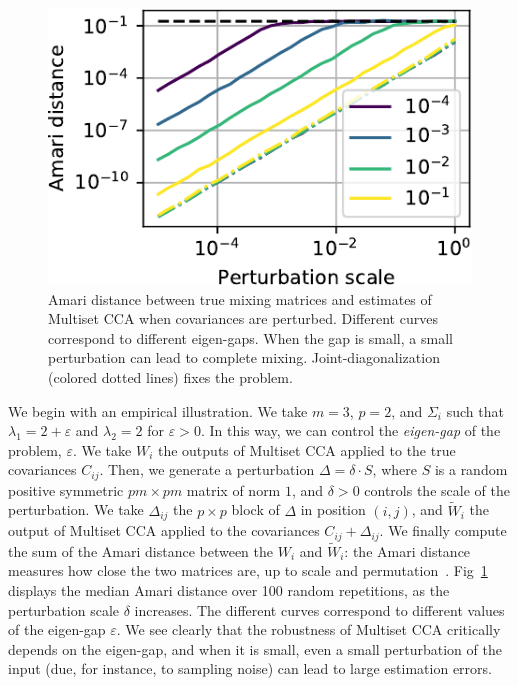 \begin{figure}
\centering
\includegraphics[width=.99\linewidth]{figures/amvica/multicca_gap_jd.pdf}
\caption{Amari distance between true mixing matrices and estimates of Multiset CCA when covariances are perturbed. Different curves correspond to different eigen-gaps. When the gap is small, a small perturbation can lead to complete mixing. Joint-diagonalization (colored dotted lines) fixes the problem.}
\label{fig:cca_gap}
\end{figure}
We begin with an empirical illustration. We take $m=3$, $p=2$, and $\Sigma_i$ such that $\lambda_1 = 2 + \varepsilon$ and $\lambda_2 =2$ for $\varepsilon > 0$.
%
In this way, we can control the \emph{eigen-gap} of the problem, $\varepsilon$.
%
%
We take $W_i$ the outputs of Multiset CCA applied to the true covariances $C_{ij}$.
%
Then, we generate a perturbation $\Delta = \delta \cdot S$, where $S$ is a random positive symmetric $pm \times pm$ matrix of norm $1$, and $\delta >0$ controls the scale of the perturbation. 
%
We take $\Delta_{ij}$ the $p\times p$ block of $\Delta$ in position $(i, j)$, and $\tilde{W}_i$ the output of Multiset CCA applied to the covariances $C_{ij} + \Delta_{ij}$.
%
We finally compute the sum of the Amari distance between the $W_i$ and $\tilde{W}_i$: the Amari distance measures how close the two matrices are, up to scale and permutation~\cite{amari1996new}.
Fig~\ref{fig:cca_gap} displays the median Amari distance over 100 random repetitions, as the perturbation scale $\delta$ increases. The different curves correspond to different values of the eigen-gap $\varepsilon$. We see clearly that the robustness of Multiset CCA critically depends on the eigen-gap, and when it is small, even a small perturbation of the input (due, for instance, to sampling noise) can lead to large estimation errors.


